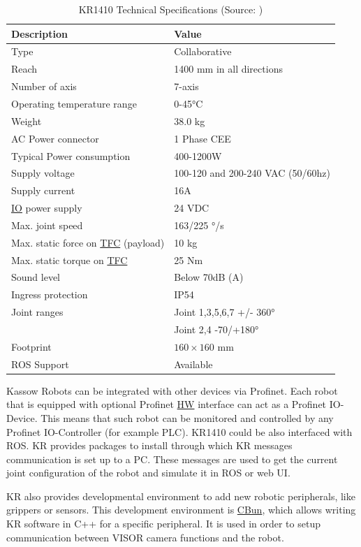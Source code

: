 \begin{table}[h!]
    \centering
    \small
    \renewcommand{\arraystretch}{1.2} %
    \begin{tabular}{ll}
        \textbf{Description} & \textbf{Value} \\ \hline
        Type & Collaborative \\
        Reach & 1400 mm in all directions\\
        Number of axis & 7-axis \\
        Operating temperature range & 0-45°C\\ 
        Weight & 38.0 kg \\ 
        AC Power connector & 1 Phase CEE \\ 
        Typical Power consumption & 400-1200W \\ 
        Supply voltage & 100-120 and 200-240 VAC (50/60hz) \\ 
        Supply current & 16A\\ 
        \hyperref[acro:IO]{IO} power supply & 24 VDC\\ 
        Max. joint speed  & 163/225 °/s\\ 
        Max. static force on \hyperref[acro:TFC]{TFC} (payload) & 10 kg\\ 
        Max. static torque on \hyperref[acro:TFC]{TFC} & 25 Nm\\ 
        Sound level & Below 70dB (A) \\ 
        Ingress protection & IP54 \\ 
        Joint ranges & Joint 1,3,5,6,7 +/- 360° \\
        & Joint 2,4 -70/+180° \\ 
        Footprint& $160 \times 160$ mm \\ 
        ROS Support & Available \\ \hline
    \end{tabular}
    \caption{KR1410 Technical Specifications (Source: \cite[page 31]{kassow-specification})}
\end{table}


Kassow Robots can be integrated with other devices via Profinet. Each robot that is equipped with optional Profinet 
\hyperref[acro:HW]{HW} interface can act as a Profinet IO-Device.
This means that such robot can be monitored and controlled by any Profinet IO-Controller (for example PLC). \cite{profinet}
KR1410 could be also interfaced with ROS. KR provides packages to install through which KR messages communication is set up to a PC.
These messages are used to get the current joint configuration of the robot and simulate it in ROS or web UI. \cite{kassow-ros}

KR also provides developmental environment to add new robotic peripherals, like grippers or sensors. This development environment is \hyperref[acro:CBun]{CBun},
which allows writing KR software in C++ for a specific peripheral. It is used in order to setup communication between VISOR camera functions and the robot. \cite{Cbun}
